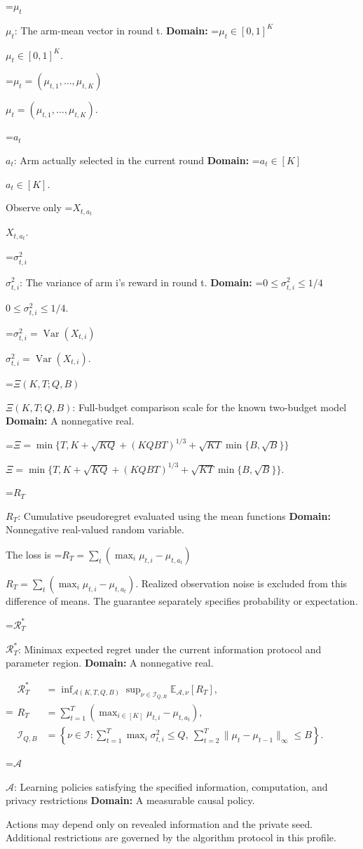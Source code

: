 \documentclass[10pt,a4paper]{article}
\newcommand{\AtlasMath}[1]{\par\begingroup\centering\setbox0=\hbox{$\displaystyle #1$}\ifdim\wd0>1.4\linewidth\typeout{ATLAS WIDE FORMULA: \the\wd0}\fi\ifdim\wd0>\linewidth\resizebox{\linewidth}{!}{\box0}\else\box0\fi\par\endgroup}
\newcommand{\AtlasInlineMath}[1]{\begingroup\setbox0=\hbox{$#1$}\ifdim\wd0>.4\linewidth\endgroup\AtlasMath{#1}\else\endgroup$#1$\fi}
\begin{document}
\AtlasInlineMath{\mu_t}: The arm-mean vector in round t. \textbf{Domain:} \AtlasInlineMath{\mu_t\in[0,1]^K}.

\AtlasInlineMath{\mu_t=(\mu_{t,1},\ldots,\mu_{t,K})}.

\AtlasInlineMath{a_t}: Arm actually selected in the current round \textbf{Domain:} \AtlasInlineMath{a_t\in[K]}.

Observe only \AtlasInlineMath{X_{t,a_t}}.

\AtlasInlineMath{\sigma_{t,i}^2}: The variance of arm i’s reward in round t. \textbf{Domain:} \AtlasInlineMath{0\le\sigma_{t,i}^2\le1/4}.

\AtlasInlineMath{\sigma_{t,i}^2=\operatorname{Var}(X_{t,i})}.

\AtlasInlineMath{\Xi(K,T;Q,B)}: Full-budget comparison scale for the known two-budget model \textbf{Domain:} A nonnegative real.

\AtlasInlineMath{\Xi=\min\{T,K+\sqrt{KQ}+(KQBT)^{1/3}+\sqrt{KT}\min\{B,\sqrt B\}\}}.

\AtlasInlineMath{R_T}: Cumulative pseudoregret evaluated using the mean functions \textbf{Domain:} Nonnegative real-valued random variable.

The loss is \AtlasInlineMath{R_T=\sum_t(\max_i\mu_{t,i}-\mu_{t,a_t})}. Realized observation noise is excluded from this difference of means. The guarantee separately specifies probability or expectation.

\AtlasInlineMath{\mathcal R_T^*}: Minimax expected regret under the current information protocol and parameter region. \textbf{Domain:} A nonnegative real.


\AtlasMath{\begin{aligned}\mathcal R_T^*&=\inf_{\mathcal A(K,T,Q,B)}\sup_{\nu\in\mathcal I_{Q,B}}\mathbb E_{\mathcal A,\nu}[R_T],\\ R_T&=\sum_{t=1}^T(\max_{i\in[K]}\mu_{t,i}-\mu_{t,a_t}),\\ \mathcal I_{Q,B}&=\left\{\nu\in\mathcal I:\sum_{t=1}^T\max_i\sigma_{t,i}^2\le Q,\ \sum_{t=2}^T\|\mu_t-\mu_{t-1}\|_\infty\le B\right\}.\end{aligned}}


\AtlasInlineMath{\mathcal A}: Learning policies satisfying the specified information, computation, and privacy restrictions \textbf{Domain:} A measurable causal policy.

Actions may depend only on revealed information and the private seed. Additional restrictions are governed by the algorithm protocol in this profile.
\end{document}
